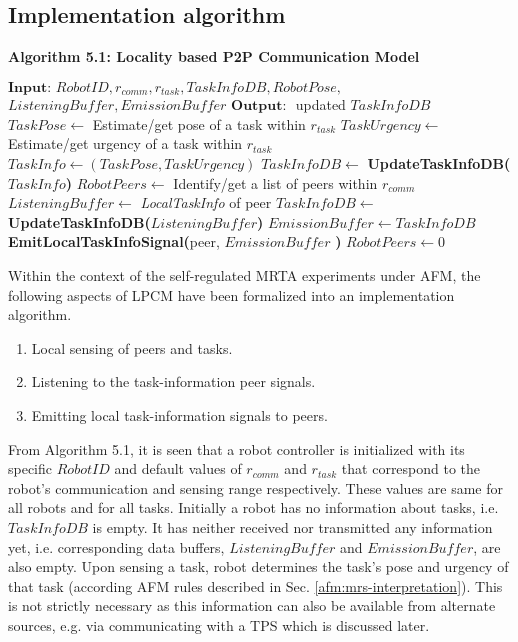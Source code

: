 \subsection{Implementation algorithm}

\textbf{\small Algorithm 5.1: Locality based P2P Communication Model}
\vspace{-3mm}
\newline
\HRule
\begin{algorithmic}[1]
\label{alg:lpcm}
\State $\textbf{Input: } RobotID, r_{comm}, r_{task}, TaskInfoDB, RobotPose,$\\ \hspace*{1cm}$ListeningBuffer, EmissionBuffer$
\State $\textbf{Output: }$ updated $TaskInfoDB$
\State {}
\State $ TaskPose \gets $ Estimate/get pose of a task within $r_{task}$
\State $ TaskUrgency \gets $ Estimate/get urgency of a task within $r_{task}$
\State $ TaskInfo \gets (TaskPose, TaskUrgency) $ 
\State $TaskInfoDB \gets$ \textbf{UpdateTaskInfoDB(}$TaskInfo$\textbf{)}
\State {}
\State $ RobotPeers \gets $ Identify/get a list of peers within $r_{comm}$
\State $ListeningBuffer \gets $ \textit{\textit{LocalTaskInfo}} of peer
\State $TaskInfoDB \gets$ \textbf{UpdateTaskInfoDB(}$ListeningBuffer$\textbf{)}
\EndIf
\EndFor
\State {}
\State $ EmissionBuffer \gets TaskInfoDB$
\State \textbf{EmitLocalTaskInfoSignal(}peer, $EmissionBuffer$ \textbf{) }
\EndFor
\State $RobotPeers \gets 0$
\end{algorithmic}
Within the context of the self-regulated MRTA experiments under AFM,  the following aspects of LPCM  have been formalized into an implementation algorithm. 
\begin{enumerate}
\item Local sensing of peers and tasks.
\item Listening to the task-information peer signals.
\item Emitting local task-information signals to peers.
\end{enumerate}
From Algorithm 5.1, it is seen that a robot controller is initialized with its specific $RobotID$ and default values of $r_{comm}$ and $r_{task}$ that correspond to the robot's communication and sensing range respectively.   These values are same for all robots and for all tasks. Initially a robot has no information about tasks, i.e. {$TaskInfoDB$} is empty. It has neither received nor transmitted any information yet, i.e. corresponding data buffers, $ListeningBuffer$ and $EmissionBuffer$, are also empty. Upon sensing a task, robot determines the task's pose and urgency of that task (according AFM rules described in Sec. \ref{afm:mrs-interpretation}). This is not strictly necessary as this information can also be available from alternate sources, e.g. via communicating with a TPS which is discussed later.

